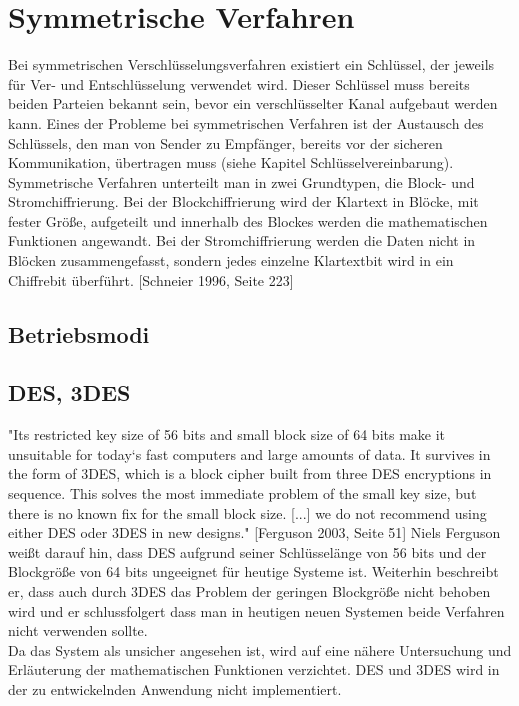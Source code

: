 \documentclass[10pt, a4paper]{scrreprt}
\begin{document}
\section{Symmetrische Verfahren}
Bei symmetrischen Verschlüsselungsverfahren existiert ein Schlüssel, der jeweils für Ver- und Entschlüsselung verwendet wird. Dieser Schlüssel muss bereits beiden Parteien bekannt sein, bevor ein verschlüsselter Kanal aufgebaut werden kann. Eines der Probleme bei symmetrischen Verfahren ist der Austausch des Schlüssels, den man von Sender zu Empfänger, bereits vor der sicheren Kommunikation, übertragen muss (siehe Kapitel Schlüsselvereinbarung). Symmetrische Verfahren unterteilt man in zwei Grundtypen, die Block- und Stromchiffrierung. Bei der Blockchiffrierung wird der Klartext in Blöcke, mit fester Größe, aufgeteilt und innerhalb des Blockes werden die mathematischen Funktionen angewandt. Bei der Stromchiffrierung werden die Daten nicht in Blöcken zusammengefasst, sondern jedes einzelne Klartextbit wird in ein Chiffrebit überführt. [Schneier 1996, Seite 223] 

\subsection{Betriebsmodi}


\subsection{DES, 3DES}
"Its restricted key size of 56 bits and small block size of 64 bits make it unsuitable for today`s fast computers and large amounts of data. It survives in the form of 3DES, which is a block cipher built from three DES encryptions in sequence. This solves the most immediate problem of the small key size, but there is no known fix for the small block size. [...] we do not recommend using either DES oder 3DES in new designs." [Ferguson 2003, Seite 51]
Niels Ferguson weißt darauf hin, dass DES aufgrund seiner Schlüsselänge von 56 bits und der Blockgröße von 64 bits ungeeignet für heutige Systeme ist. Weiterhin beschreibt er, dass auch durch 3DES das Problem der geringen Blockgröße nicht behoben wird und er schlussfolgert dass man in heutigen neuen Systemen beide Verfahren nicht verwenden sollte. \\
Da das System als unsicher angesehen ist, wird auf eine nähere Untersuchung und Erläuterung der mathematischen Funktionen verzichtet. DES und 3DES wird in der zu entwickelnden Anwendung nicht implementiert.
\end{document}
